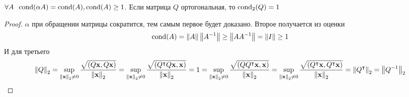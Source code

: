 \begin{lemma}
  $\forall A \;\; \operatorname{cond}(\alpha A) = \operatorname{cond}(A), \operatorname{cond}(A) \ge 1$. Если матрица $Q$ ортогональная, то $\operatorname{cond}_2(Q) = 1$
  \begin{proof}
    $\alpha$ при обращении матрицы сократится, тем самым первое будет доказано. Второе получается из оценки
    $$
      \operatorname{cond}(A) = \left\lVert A\right\rVert\left\lVert A^{-1}\right\rVert \ge \left\lVert A A^{-1}\right\rVert = \left\lVert I\right\rVert \ge 1
    $$
    И для третьего
    $$
      \left\lVert Q\right\rVert_2 = \sup_{\left\lVert\mathbf{x}\right\rVert_{2} \neq 0} \frac{\sqrt{(Q\mathbf{x}, Q\mathbf{x})}}{\left\lVert\mathbf{x}\right\rVert_{2}} =
      \sup_{\left\lVert\mathbf{x}\right\rVert_{2} \neq 0} \frac{\sqrt{(Q^\intercal Q\mathbf{x}, \mathbf{x})}}{\left\lVert\mathbf{x}\right\rVert_{2}} = 1 =
      \sup_{\left\lVert\mathbf{x}\right\rVert_{2} \neq 0} \frac{\sqrt{(Q Q^\intercal \mathbf{x}, \mathbf{x})}}{\left\lVert\mathbf{x}\right\rVert_{2}} =
      \sup_{\left\lVert\mathbf{x}\right\rVert_{2} \neq 0} \frac{\sqrt{( Q^\intercal \mathbf{x},Q^\intercal \mathbf{x})}}{\left\lVert\mathbf{x}\right\rVert_{2}} =
      \left\lVert Q^\intercal\right\rVert_2 =
      \left\lVert Q^{-1}\right\rVert_2
    $$
  \end{proof}
\end{lemma}

